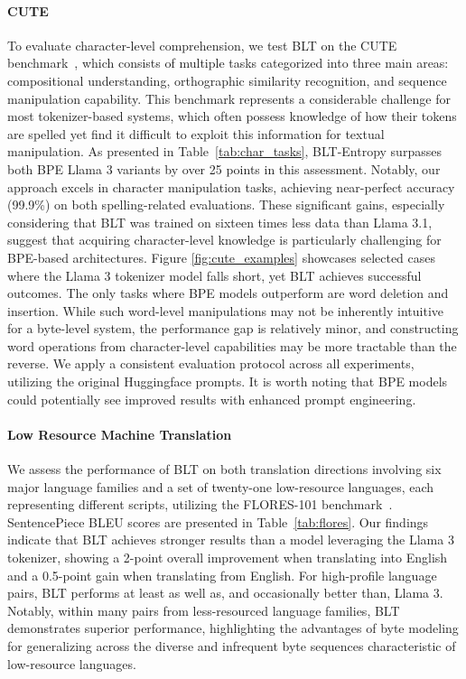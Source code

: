 \paragraph{CUTE}
To evaluate character-level comprehension, we test {\textsc BLT} on the CUTE benchmark~\citep{edman2024cute}, which consists of multiple tasks categorized into three main areas: compositional understanding, orthographic similarity recognition, and sequence manipulation capability. This benchmark represents a considerable challenge for most tokenizer-based systems, which often possess knowledge of how their tokens are spelled yet find it difficult to exploit this information for textual manipulation. As presented in Table~\ref{tab:char_tasks}, {\textsc BLT}-Entropy surpasses both BPE Llama 3 variants by over 25 points in this assessment. Notably, our approach excels in character manipulation tasks, achieving near-perfect accuracy (99.9\%) on both spelling-related evaluations. These significant gains, especially considering that {\textsc BLT} was trained on sixteen times less data than Llama 3.1, suggest that acquiring character-level knowledge is particularly challenging for BPE-based architectures. Figure \ref{fig:cute_examples} showcases selected cases where the Llama 3 tokenizer model falls short, yet {\textsc BLT} achieves successful outcomes. The only tasks where BPE models outperform are word deletion and insertion. While such word-level manipulations may not be inherently intuitive for a byte-level system, the performance gap is relatively minor, and constructing word operations from character-level capabilities may be more tractable than the reverse. We apply a consistent evaluation protocol across all experiments, utilizing the original Huggingface prompts. It is worth noting that BPE models could potentially see improved results with enhanced prompt engineering.

\paragraph{Low Resource Machine Translation} We assess the performance of {\textsc BLT} on both translation directions involving six major language families and a set of twenty-one low-resource languages, each representing different scripts, utilizing the FLORES-101 benchmark~\citep{goyal2022flores}. SentencePiece BLEU scores are presented in Table~\ref{tab:flores}. Our findings indicate that {\textsc BLT} achieves stronger results than a model leveraging the Llama 3 tokenizer, showing a 2-point overall improvement when translating into English and a 0.5-point gain when translating from English. For high-profile language pairs, {\textsc BLT} performs at least as well as, and occasionally better than, Llama 3. Notably, within many pairs from less-resourced language families, {\textsc BLT} demonstrates superior performance, highlighting the advantages of byte modeling for generalizing across the diverse and infrequent byte sequences characteristic of low-resource languages.

